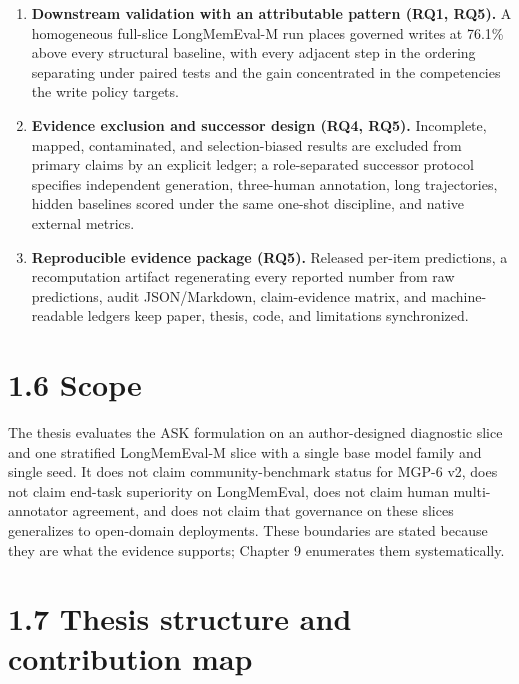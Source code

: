 \begin{enumerate}
  selectively risk-targeted. Each is reported rather than omitted.
\item
  \textbf{Downstream validation with an attributable pattern (RQ1,
  RQ5).} A homogeneous full-slice LongMemEval-M run places governed
  writes at 76.1\% above every structural baseline, with every adjacent
  step in the ordering separating under paired tests and the gain
  concentrated in the competencies the write policy targets.
\item
  \textbf{Evidence exclusion and successor design (RQ4, RQ5).}
  Incomplete, mapped, contaminated, and selection-biased results are
  excluded from primary claims by an explicit ledger; a role-separated
  successor protocol specifies independent generation, three-human
  annotation, long trajectories, hidden baselines scored under the same
  one-shot discipline, and native external metrics.
\item
  \textbf{Reproducible evidence package (RQ5).} Released per-item
  predictions, a recomputation artifact regenerating every reported
  number from raw predictions, audit JSON/Markdown, claim-evidence
  matrix, and machine-readable ledgers keep paper, thesis, code, and
  limitations synchronized.
\end{enumerate}

\section{1.6 Scope}\label{scope}

The thesis evaluates the ASK formulation on an author-designed
diagnostic slice and one stratified LongMemEval-M slice with a single
base model family and single seed. It does not claim community-benchmark
status for MGP-6 v2, does not claim end-task superiority on LongMemEval,
does not claim human multi-annotator agreement, and does not claim that
governance on these slices generalizes to open-domain deployments. These
boundaries are stated because they are what the evidence supports;
Chapter 9 enumerates them systematically.

\section{1.7 Thesis structure and contribution
map}\label{thesis-structure-and-contribution-map}

